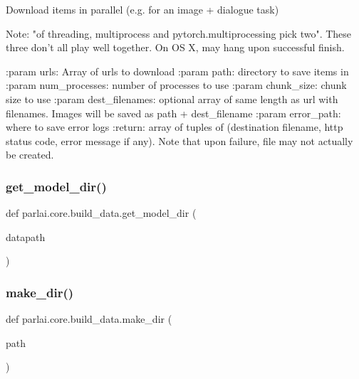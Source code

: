 \begin{DoxyVerb}Download items in parallel (e.g. for an image + dialogue task)

Note: "of threading, multiprocess and pytorch.multiprocessing pick two".
These three don't all play well together. On OS X, may hang upon successful finish.

:param urls: Array of urls to download
:param path: directory to save items in
:param num_processes: number of processes to use
:param chunk_size: chunk size to use
:param dest_filenames: optional array of same length as url with filenames.
 Images will be saved as path + dest_filename
:param error_path: where to save error logs
:return: array of tuples of (destination filename, http status code, error
message if any). Note that upon failure, file may not actually be created.
\end{DoxyVerb}
 \mbox{\label{namespaceparlai_1_1core_1_1build__data_ad2fe6222094caae59f304931aee0952a}} 
\subsubsection{\texorpdfstring{get\+\_\+model\+\_\+dir()}{get\_model\_dir()}}
{\footnotesize\ttfamily def parlai.\+core.\+build\+\_\+data.\+get\+\_\+model\+\_\+dir (\begin{DoxyParamCaption}\item[{}]{datapath }\end{DoxyParamCaption})}

\mbox{\label{namespaceparlai_1_1core_1_1build__data_a6ce042fedd4194bd016845bbe7a8facf}} 
\subsubsection{\texorpdfstring{make\+\_\+dir()}{make\_dir()}}
{\footnotesize\ttfamily def parlai.\+core.\+build\+\_\+data.\+make\+\_\+dir (\begin{DoxyParamCaption}\item[{}]{path }\end{DoxyParamCaption})}

